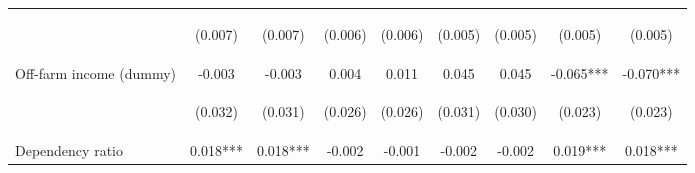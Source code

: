 \begin{center}
\begin{tabular}{lcccccccc}
\vspace{4pt} & \begin{footnotesize}(0.007)\end{footnotesize} & \begin{footnotesize}(0.007)\end{footnotesize} & \begin{footnotesize}(0.006)\end{footnotesize} & \begin{footnotesize}(0.006)\end{footnotesize} & \begin{footnotesize}(0.005)\end{footnotesize} & \begin{footnotesize}(0.005)\end{footnotesize} & \begin{footnotesize}(0.005)\end{footnotesize} & \begin{footnotesize}(0.005)\end{footnotesize} \\
Off-farm income (dummy) & -0.003 & -0.003 & 0.004 & 0.011 & 0.045 & 0.045 & -0.065*** & -0.070*** \\
\vspace{4pt} & \begin{footnotesize}(0.032)\end{footnotesize} & \begin{footnotesize}(0.031)\end{footnotesize} & \begin{footnotesize}(0.026)\end{footnotesize} & \begin{footnotesize}(0.026)\end{footnotesize} & \begin{footnotesize}(0.031)\end{footnotesize} & \begin{footnotesize}(0.030)\end{footnotesize} & \begin{footnotesize}(0.023)\end{footnotesize} & \begin{footnotesize}(0.023)\end{footnotesize} \\
Dependency ratio & 0.018*** & 0.018*** & -0.002 & -0.001 & -0.002 & -0.002 & 0.019*** & 0.018*** \\

\end{tabular}
\end{center}
